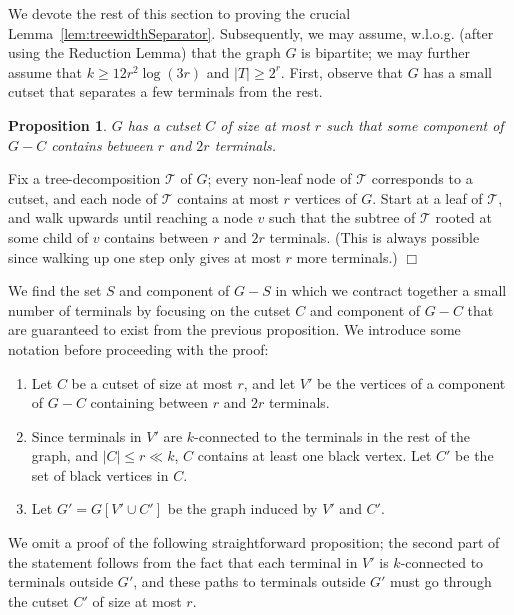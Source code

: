 \documentclass[11pt]{article}
\newtheorem{prop}[lemma]{Proposition}
\newenvironment{proofsketch}{\vspace{-0.1in}\noindent{\bf Proof Sketch:}}{\hspace*{\fill}$\Box$\par}
\def\script#1{\mathcal{#1}}
\begin{document}
We devote the rest of this section to proving the crucial
Lemma~\ref{lem:treewidthSeparator}.  Subsequently, we may assume,
w.l.o.g. (after using the Reduction Lemma) that the graph $G$ is
bipartite; we may further assume that $k \ge 12r^2 \log (3r)$ and $|T|
\ge 2^r$. First, observe that $G$ has a small cutset that separates a
few terminals from the rest.

\begin{prop}
  $G$ has a cutset $C$ of size at most $r$ such that some component of
  $G - C$ contains between $r$ and $2r$ terminals.
\end{prop}
\begin{proofsketch}
  Fix a tree-decomposition $\script{T}$ of $G$; every non-leaf node of
  $\script{T}$ corresponds to a cutset, and each node of $\script{T}$
  contains at most $r$ vertices of $G$. Start at a leaf of
  $\script{T}$, and walk upwards until reaching a node $v$ such that
  the subtree of $\script{T}$ rooted at some child of $v$ contains
  between $r$ and $2r$ terminals. (This is always possible since
  walking up one step only gives at most $r$ more terminals.)
\end{proofsketch}

We find the set $S$ and component of $G - S$ in which we contract
together a small number of terminals by focusing on the cutset $C$ and
component of $G-C$ that are guaranteed to exist from the previous
proposition. We introduce some notation before proceeding with the proof:

\begin{enumerate}
\item Let $C$ be a cutset of size at most $r$, and let $V'$ be the
  vertices of a component of $G - C$ containing between $r$ and $2r$
  terminals.

\item Since terminals in $V'$ are $k$-connected to the terminals in
  the rest of the graph, and $|C| \le r \ll k$, $C$ contains at least
  one black vertex. Let $C'$ be the set of black vertices in $C$.

\item Let $G' = G[V' \cup C']$ be the graph induced by $V'$ and $C'$.
\end{enumerate}

We omit a proof of the following straightforward proposition; the
second part of the statement follows from the fact that each terminal in
$V'$ is $k$-connected to terminals outside $G'$, and these paths to
terminals outside $G'$ must go through the cutset $C'$ of size at most
$r$.
\end{document}
